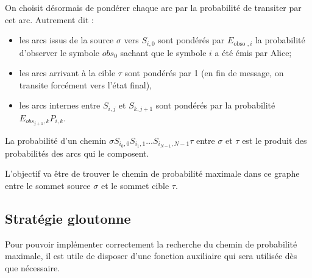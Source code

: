 
On choisit désormais de pondérer chaque arc par la probabilité de transiter par cet arc. Autrement dit :

\begin{itemize}
  \item les arcs issus de la source $\sigma$ vers $S_{i, 0}$ sont pondérés par $E_{\text {obso }, i}$ la probabilité d'observer le symbole $o b s_{0}$ sachant que le symbole $i$ a été émis par Alice;
  \item les arcs arrivant à la cible $\tau$ sont pondérés par 1 (en fin de message, on transite forcément vers l'état final),
  \item les arcs internes entre $S_{i, j}$ et $S_{k, j+1}$ sont pondérés par la probabilité $E_{o b s_{j+1}, k} P_{i, k}$.
\end{itemize}

La probabilité d'un chemin $\sigma S_{i_{0}, 0} S_{i_{1}, 1} \ldots S_{i_{N-1}, N-1} \tau$ entre $\sigma$ et $\tau$ est le produit des probabilités des arcs qui le composent.

L'objectif va être de trouver le chemin de probabilité maximale dans ce graphe entre le sommet source $\sigma$ et le sommet cible $\tau$.\\[0pt]



\subsection{Stratégie gloutonne}
Pour pouvoir implémenter correctement la recherche du chemin de probabilité maximale, il est utile de disposer d'une fonction auxiliaire qui sera utilisée dès que nécessaire.

